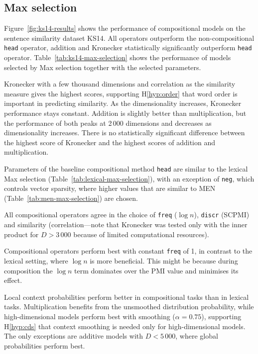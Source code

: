 \subsection{Max selection}
\label{sec:max-selection-ks14}

Figure~\ref{fig:ks14-results} shows the performance of compositional models on the sentence similarity dataset KS14. All operators outperform the non-compositional \texttt{head} operator, addition and Kronecker statistically significantly outperform \texttt{head} operator. Table~\ref{tab:ks14-max-selection} shows the performance of models selected by Max selection together with the selected parameters.

Kronecker with a few thousand dimensions and correlation as the similarity measure gives the highest scores, supporting H\ref{hyp:order} that word order is important in predicting similarity. As the dimensionality increases, Kronecker performance stays constant. Addition is slightly better than multiplication, but the performance of both peaks at 2\,000 dimensions and decreases as dimensionality increases. There is no statistically significant difference between the highest score of Kronecker and the highest scores of addition and multiplication.



Parameters of the baseline compositional method \texttt{head} are similar to the lexical Max selection (Table~\ref{tab:lexical-max-selection}), with an exception of \texttt{neg}, which controls vector sparsity, where higher values that are similar to MEN (Table~\ref{tab:men-max-selection}) are chosen.

All compositional operators agree in the choice of \texttt{freq} ($\log n$), \texttt{discr} (SCPMI) and similarity (correlation---note that Kronecker was tested only with the inner product for $D > 3\,000$ because of limited computational resources).

Compositional operators perform best with constant \texttt{freq} of 1, in contrast to the lexical setting, where $\log n$ is more beneficial. This might be because during composition the $\log n$ term dominates over the PMI value and minimises its effect.

Local context probabilities perform better in compositional tasks than in lexical tasks. Multiplication benefits from the unsmoothed distribution probability, while high-dimensional models perform best with smoothing ($\alpha = 0.75$), supporting H\ref{hyp:cds} that context smoothing is needed only for high-dimensional models. The only exceptions are additive models with $D < 5\,000$, where global probabilities perform best.

